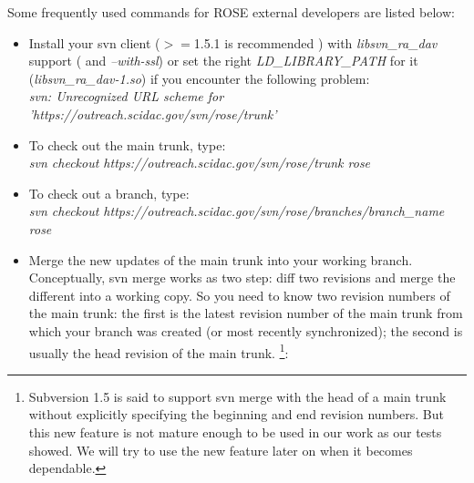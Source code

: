 Some frequently used commands for ROSE external developers are listed
below:
\begin{itemize}
\item Install your svn client ($>=$1.5.1 is recommended ) with
\textit{libsvn\_ra\_dav} support
(
and \textit{--with-ssl}) or set the right \textit{LD\_LIBRARY\_PATH} for it
(\textit{libsvn\_ra\_dav-1.so}) if you encounter the following problem:\\
 \textit{svn: Unrecognized URL scheme for
 'https://outreach.scidac.gov/svn/rose/trunk'} 
\item To check out the main trunk, type: \\
\textit{svn checkout https://outreach.scidac.gov/svn/rose/trunk rose}
\item To check out a branch, type: \\
\textit{svn checkout
https://outreach.scidac.gov/svn/rose/branches/branch\_name rose} 
\item Merge the new updates of the main trunk into your working branch. 
Conceptually, svn merge works as two step: diff two revisions and merge the different into a working copy.
So you need to know two revision numbers of the main
trunk:
the first is
the latest revision number of the main trunk from which your branch was
created (or most recently synchronized);
the second is usually the head revision of the main trunk.
\footnote{Subversion 1.5 is said to support svn merge with the head of
a main trunk without explicitly specifying the beginning and end revision
numbers. But this new feature is not mature enough to be used in our work
as our tests showed. We will try to use the new feature later on when it
becomes dependable.}: 


\end{itemize}
